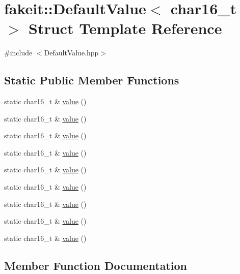 \hypertarget{structfakeit_1_1DefaultValue_3_01char16__t_01_4}{}\section{fakeit\+::Default\+Value$<$ char16\+\_\+t $>$ Struct Template Reference}
\label{structfakeit_1_1DefaultValue_3_01char16__t_01_4}


{\ttfamily \#include $<$Default\+Value.\+hpp$>$}

\subsection*{Static Public Member Functions}
\begin{DoxyCompactItemize}
\item 
static char16\+\_\+t \& \mbox{\hyperlink{structfakeit_1_1DefaultValue_3_01char16__t_01_4_a9d63a20d4075a4a970a51752fda22dfc}{value}} ()
\item 
static char16\+\_\+t \& \mbox{\hyperlink{structfakeit_1_1DefaultValue_3_01char16__t_01_4_a9d63a20d4075a4a970a51752fda22dfc}{value}} ()
\item 
static char16\+\_\+t \& \mbox{\hyperlink{structfakeit_1_1DefaultValue_3_01char16__t_01_4_a9d63a20d4075a4a970a51752fda22dfc}{value}} ()
\item 
static char16\+\_\+t \& \mbox{\hyperlink{structfakeit_1_1DefaultValue_3_01char16__t_01_4_a9d63a20d4075a4a970a51752fda22dfc}{value}} ()
\item 
static char16\+\_\+t \& \mbox{\hyperlink{structfakeit_1_1DefaultValue_3_01char16__t_01_4_a9d63a20d4075a4a970a51752fda22dfc}{value}} ()
\item 
static char16\+\_\+t \& \mbox{\hyperlink{structfakeit_1_1DefaultValue_3_01char16__t_01_4_a9d63a20d4075a4a970a51752fda22dfc}{value}} ()
\item 
static char16\+\_\+t \& \mbox{\hyperlink{structfakeit_1_1DefaultValue_3_01char16__t_01_4_a9d63a20d4075a4a970a51752fda22dfc}{value}} ()
\item 
static char16\+\_\+t \& \mbox{\hyperlink{structfakeit_1_1DefaultValue_3_01char16__t_01_4_a9d63a20d4075a4a970a51752fda22dfc}{value}} ()
\item 
static char16\+\_\+t \& \mbox{\hyperlink{structfakeit_1_1DefaultValue_3_01char16__t_01_4_a9d63a20d4075a4a970a51752fda22dfc}{value}} ()
\end{DoxyCompactItemize}


\subsection{Member Function Documentation}
\mbox{\label{structfakeit_1_1DefaultValue_3_01char16__t_01_4_a9d63a20d4075a4a970a51752fda22dfc}} 
